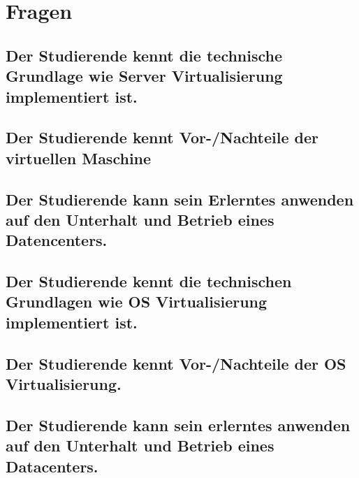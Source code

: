 \section{Fragen}

\subsection{Der Studierende kennt die technische Grundlage wie Server Virtualisierung implementiert ist.}

\subsection{Der Studierende kennt Vor-/Nachteile der virtuellen Maschine}

\subsection{Der Studierende kann sein Erlerntes anwenden auf den Unterhalt und Betrieb eines Datencenters.}

\subsection{Der Studierende kennt die technischen Grundlagen wie OS
Virtualisierung implementiert ist.}

\subsection{Der Studierende kennt Vor-/Nachteile der OS Virtualisierung.}

\subsection{Der Studierende kann sein erlerntes anwenden auf den Unterhalt und Betrieb eines Datacenters.}